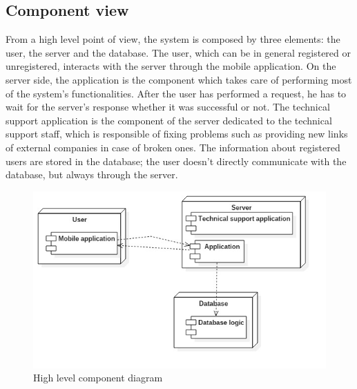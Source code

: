 \documentclass[a4paper,leqno]{article}
\begin{document}
\subsection{Component view}
From a high level point of view, the system is composed by three elements: the user, the server and the database. The user, which can be in general registered or unregistered, interacts with the server through the mobile application. On the server side, the application is the component which takes care of performing most of the system's functionalities. After the user has performed a request, he has to wait for the server's response whether it was successful or not. The technical support application is the component of the server dedicated to the technical support staff, which is responsible of fixing problems such as providing new links of external companies in case of broken ones. The information about registered users are stored in the database; the user doesn't directly communicate with the database, but always through the server.
\begin{figure}[!h]
	\centering
	\begin{center}
		\includegraphics[scale=0.3]{ComponentHighView_241117_1}
	\end{center}
	\caption{High level component diagram}
\end{figure}
\end{document}
